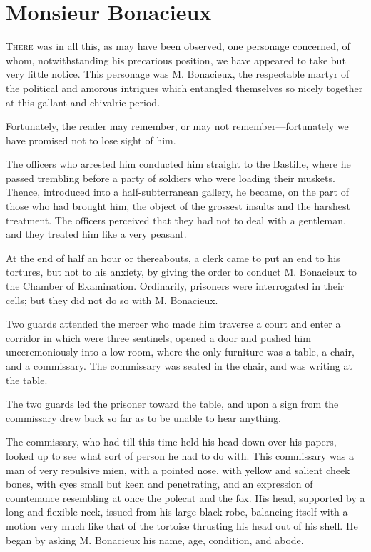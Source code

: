 
\chapter{Monsieur Bonacieux}

\lettrine[]{T}{here} was in all this, as may have been observed, one personage concerned, of whom, notwithstanding his precarious position, we have appeared to take but very little notice. This personage was M. Bonacieux, the respectable martyr of the political and amorous intrigues which entangled themselves so nicely together at this gallant and chivalric period. 

Fortunately, the reader may remember, or may not remember---fortunately we have promised not to lose sight of him. 

The officers who arrested him conducted him straight to the Bastille, where he passed trembling before a party of soldiers who were loading their muskets. Thence, introduced into a half-subterranean gallery, he became, on the part of those who had brought him, the object of the grossest insults and the harshest treatment. The officers perceived that they had not to deal with a gentleman, and they treated him like a very peasant. 

At the end of half an hour or thereabouts, a clerk came to put an end to his tortures, but not to his anxiety, by giving the order to conduct M. Bonacieux to the Chamber of Examination. Ordinarily, prisoners were interrogated in their cells; but they did not do so with M. Bonacieux. 

Two guards attended the mercer who made him traverse a court and enter a corridor in which were three sentinels, opened a door and pushed him unceremoniously into a low room, where the only furniture was a table, a chair, and a commissary. The commissary was seated in the chair, and was writing at the table. 

The two guards led the prisoner toward the table, and upon a sign from the commissary drew back so far as to be unable to hear anything. 

The commissary, who had till this time held his head down over his papers, looked up to see what sort of person he had to do with. This commissary was a man of very repulsive mien, with a pointed nose, with yellow and salient cheek bones, with eyes small but keen and penetrating, and an expression of countenance resembling at once the polecat and the fox. His head, supported by a long and flexible neck, issued from his large black robe, balancing itself with a motion very much like that of the tortoise thrusting his head out of his shell. He began by asking M. Bonacieux his name, age, condition, and abode. 

